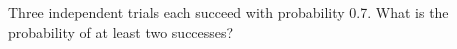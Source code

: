 Three independent trials each succeed with probability 0.7. What is the probability of at least two successes?
